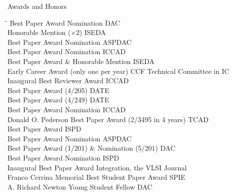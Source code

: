 
\begin{rSection}{Awards and Honors}
\begin{tabbing}
\hspace{3.8in}\= \hspace{2.6in}\= \kill
Best Paper Award Nomination \> DAC  \\
Honorable Mention ($\times$2) \> ISEDA  \\
Best Paper Award Nomination \> ASPDAC  \\
Best Paper Award Nomination \> ICCAD  \\
Best Paper Award \& Honorable Mention \> ISEDA  \\
Early Career Award (only one per year) \> CCF Technical Committee in IC  \\
Inaugural Best Reviewer Award \> ICCAD  \\
Best Paper Award (4/205) \> DATE  \\
Best Paper Award (4/249) \> DATE  \\
Best Paper Award Nomination \> ICCAD  \\
Donald O. Pederson Best Paper Award (2/3495 in 4 years) \> TCAD  \\
Best Paper Award \> ISPD  \\
Best Paper Award Nomination \> ASPDAC  \\
Best Paper Award (1/201) \& Nomination (5/201) \> DAC  \\
Best Paper Award Nomination \> ISPD  \\
Inaugural Best Paper Award \> Integration, the VLSI Journal  \\
Franco Cerrina Memorial Best Student Paper Award \> SPIE  \\
A. Richard Newton Young Student Fellow \> DAC  \\
\end{tabbing}
\end{rSection}

